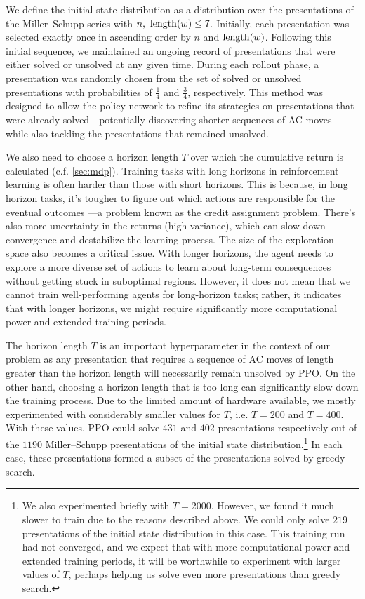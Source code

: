 We define the initial state distribution as a distribution over the presentations of the Miller--Schupp series with $n, \ \operatorname{length}(w) \leq 7$. Initially, each presentation was selected exactly once in ascending order by $n$ and $\operatorname{length}(w)$. Following this initial sequence, we maintained an ongoing record of presentations that were either solved or unsolved at any given time. During each rollout phase, a presentation was randomly chosen from the set of solved or unsolved presentations with probabilities of  $\frac{1}{4}$ and $\frac{3}{4}$, respectively. This method was designed to allow the policy network to refine its strategies on presentations that were already solved—potentially discovering shorter sequences of AC moves—while also tackling the presentations that remained unsolved.

We also need to choose a horizon length $T$ over which the cumulative return is calculated (c.f. \autoref{sec:mdp}). Training tasks with long horizons in reinforcement learning is often harder than those with short horizons. This is because, in long horizon tasks, it's tougher to figure out which actions are responsible for the eventual outcomes —a problem known as the credit assignment problem. There's also more uncertainty in the returns (high variance), which can slow down convergence and destabilize the learning process. The size of the exploration space also becomes a critical issue. With longer horizons, the agent needs to explore a more diverse set of actions to learn about long-term consequences without getting stuck in suboptimal regions. However, it does not mean that we cannot train well-performing agents for long-horizon tasks; rather, it indicates that with longer horizons, we might require significantly more computational power and extended training periods.

The horizon length $T$ is an important hyperparameter in the context of our problem as any presentation that requires a sequence of AC moves of length greater than the horizon length will necessarily remain unsolved by PPO. On the other hand, choosing a horizon length that is too long can significantly slow down the training process. Due to the limited amount of hardware available, we mostly experimented with considerably smaller values for $T$, i.e. $T=200$ and $T=400$.  With these values, PPO could solve $431$ and $402$ presentations respectively out of the $1190$ Miller--Schupp presentations of the initial state distribution.\footnote{
We also experimented briefly with $T=2000$. However, we found it much slower to train due to the reasons described above. We could only solve $219$ presentations of the initial state distribution in this case. This training run had not converged, and we expect that with more computational power and extended training periods, it will be worthwhile to experiment with larger values of $T$, perhaps helping us solve even more presentations than greedy search.}
In each case, these presentations formed a subset of the presentations solved by greedy search.

